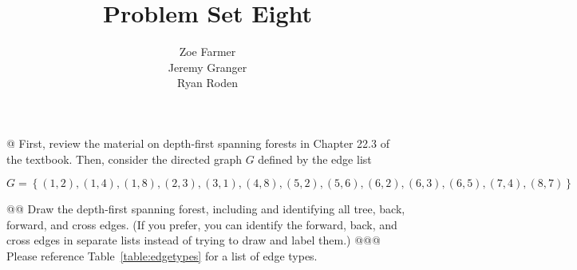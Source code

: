 \documentclass[10pt]{article}\usepackage[]{graphicx}\usepackage[]{xcolor}
\title{Problem Set Eight}
\author{Zoe Farmer\\Jeremy Granger\\Ryan Roden}
\makeatletter
\newenvironment{kframe}{%
 \def\at@end@of@kframe{}%
 \ifinner\ifhmode%
  \def\at@end@of@kframe{\end{minipage}}%
  \begin{minipage}{\columnwidth}%
 \fi\fi%
 \def\FrameCommand##1{\hskip\@totalleftmargin \hskip-\fboxsep
 \colorbox{shadecolor}{##1}\hskip-\fboxsep
     \hskip-\linewidth \hskip-\@totalleftmargin \hskip\columnwidth}%
 \MakeFramed {\advance\hsize-\width
   \@totalleftmargin\z@ \linewidth\hsize
   \@setminipage}}%
 {\par\unskip\endMakeFramed%
 \at@end@of@kframe}
\newenvironment{knitrout}{}{} %
\makeatother
\begin{document}
\maketitle

\begin{knitrout}
\color{fgcolor}\begin{kframe}


{\ttfamily\noindent\bfseries{}}\end{kframe}
\end{knitrout}

\begin{easylist}[enumerate]
    @ First, review the material on depth-first spanning forests in Chapter 22.3 of the textbook. Then, consider the
    directed graph $G$ defined by the edge list

    \[
        G =
        \left\{
            (1, 2),
            (1, 4),
            (1, 8),
            (2, 3),
            (3, 1),
            (4, 8),
            (5, 2),
            (5, 6),
            (6, 2),
            (6, 3),
            (6, 5),
            (7, 4),
            (8, 7)
        \right\}
    \]

\begin{knitrout}
\color{fgcolor}\begin{kframe}


{\ttfamily\noindent\bfseries{}}\end{kframe}
\end{knitrout}

    @@ Draw the depth-first spanning forest, including and identifying all tree, back, forward, and cross edges. (If you
    prefer, you can identify the forward, back, and cross edges in separate lists instead of trying to draw and label
    them.)
    @@@ Please reference Table~\ref{table:edgetypes} for a list of edge types.

\begin{knitrout}
\color{fgcolor}\begin{kframe}


{\ttfamily\noindent\bfseries{}}\end{kframe}
\end{knitrout}


\end{easylist}
\end{document}
